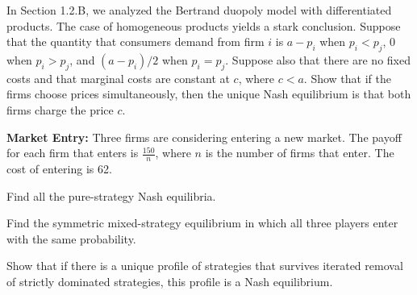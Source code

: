 
In Section 1.2.B, we analyzed the Bertrand duopoly model with differentiated products. The
case of homogeneous products yields a stark conclusion. Suppose that the quantity that consumers
demand from firm $i$ is $a - p_i$ when $p_i < p_j$, 0 when $p_i > p_j$, and $(a - p_i)/2$ when
$p_i = p_j$. Suppose also that there are no fixed costs and that marginal costs are constant at
$c$, where $c < a$. Show that if the firms choose prices simultaneously, then the unique Nash
equilibrium is that both firms charge the price $c$.
\resolespaco


\textbf{Market Entry:} Three firms are considering entering a new market. The payoff for
each firm that enters is $\frac{150}{n}$, where $n$ is the number of firms that enter. The cost of
entering is 62.
\begin{partes}
\item Find all the pure-strategy Nash equilibria.
\item Find the symmetric mixed-strategy equilibrium in which all three players enter with the same
probability.
\end{partes}
\resolespaco


Show that if there is a unique profile of strategies that survives iterated
removal of strictly dominated strategies, this profile is a Nash equilibrium.
\resolespaco


